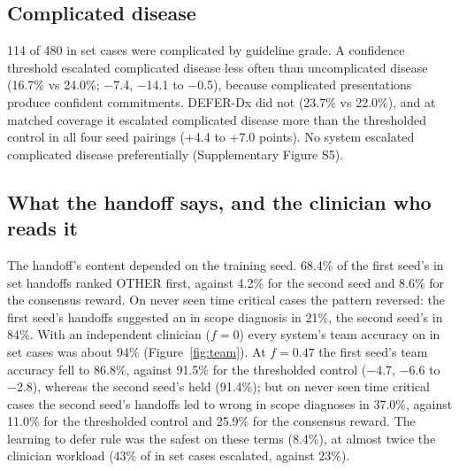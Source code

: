 \documentclass[11pt]{article}
\begin{document}
\subsection*{Complicated disease}
114 of 480 in set cases were complicated by guideline grade. A confidence threshold escalated complicated disease less often than uncomplicated disease (16.7\% vs 24.0\%; $-$7.4, $-$14.1 to $-$0.5), because complicated presentations produce confident commitments. DEFER-Dx did not (23.7\% vs 22.0\%), and at matched coverage it escalated complicated disease more than the thresholded control in all four seed pairings (+4.4 to +7.0 points). No system escalated complicated disease preferentially (Supplementary Figure S5).

\subsection*{What the handoff says, and the clinician who reads it}
The handoff's content depended on the training seed. 68.4\% of the first seed's in set handoffs ranked OTHER first, against 4.2\% for the second seed and 8.6\% for the consensus reward. On never seen time critical cases the pattern reversed: the first seed's handoffs suggested an in scope diagnosis in 21\%, the second seed's in 84\%. With an independent clinician ($f = 0$) every system's team accuracy on in set cases was about 94\% (Figure~\ref{fig:team}). At $f = 0.47$ the first seed's team accuracy fell to 86.8\%, against 91.5\% for the thresholded control ($-$4.7, $-$6.6 to $-$2.8), whereas the second seed's held (91.4\%); but on never seen time critical cases the second seed's handoffs led to wrong in scope diagnoses in 37.0\%, against 11.0\% for the thresholded control and 25.9\% for the consensus reward. The learning to defer rule was the safest on these terms (8.4\%), at almost twice the clinician workload (43\% of in set cases escalated, against 23\%).
\end{document}
